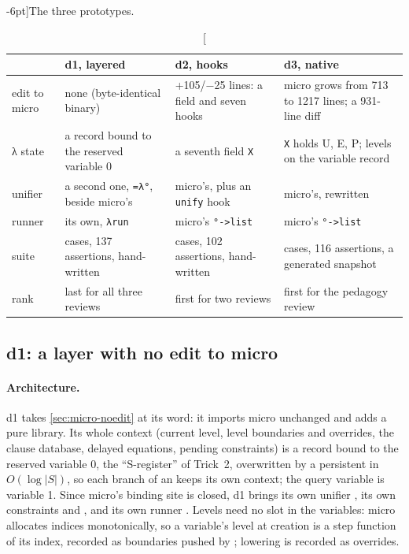 \begin{table}[ht]
\footnotesize
\caption[][-6pt]{The three prototypes.}
\label{tab:design-prototypes}
\renewcommand{\arraystretch}{1.2}
\begin{tabularx}{\linewidth}{@{}p{2.3cm}>{\raggedright\arraybackslash}X>{\raggedright\arraybackslash}X>{\raggedright\arraybackslash}X@{}}
\toprule
& \textbf{d1, layered} & \textbf{d2, hooks} & \textbf{d3, native}\\
\midrule
edit to micro & none (byte-identical binary) & +105/−25 lines: a field and seven hooks & micro grows from 713 to 1217 lines; a 931-line diff\\
λ state & a record bound to the reserved variable 0 & a seventh field \texttt{X} & \texttt{X} holds U, E, P; levels on the variable record\\
unifier & a second one, \texttt{=λ°}, beside micro's & micro's, plus an \texttt{unify} hook & micro's, rewritten\\
runner & its own, \texttt{λrun} & micro's \texttt{°->list} & micro's \texttt{°->list}\\
suite & 29 cases, 137 assertions, hand-written & 42 cases, 102 assertions, hand-written & 14 cases, 116 assertions, a generated snapshot\\
rank & last for all three reviews & first for two reviews & first for the pedagogy review\\
\bottomrule
\end{tabularx}\par\vspace{16pt}%
\end{table}

\subsection{d1: a layer with no edit to micro}\label{sec:design-d1}

\paragraph{Architecture.} d1 takes \cref{sec:micro-noedit} at its word: it imports micro unchanged and
adds a pure library. Its whole context (current level, level boundaries and overrides, the clause
database, delayed equations, pending constraints) is a record bound to the reserved variable 0, the
\enquote{S-register} of Trick~2, overwritten by a persistent  in $O(\log|S|)$, so
each branch of an  keeps its own context; the query variable is variable 1. Since micro's binding site is closed, d1 brings its own unifier , its own
constraints  and , and its own runner . Levels need no slot in the
variables: micro allocates indices monotonically, so a variable's level at creation is a step function
of its index, recorded as boundaries pushed by ; lowering is recorded as overrides.


